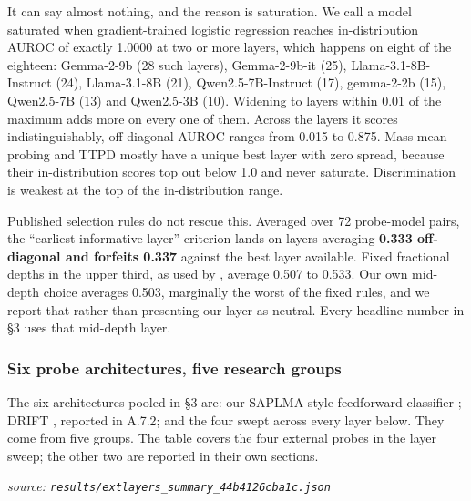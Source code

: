 \documentclass[10pt]{article}
\begin{document}
It can say almost nothing, and the reason is saturation. We call a model saturated when gradient-trained logistic regression reaches in-distribution AUROC of exactly 1.0000 at two or more layers, which happens on eight of the eighteen: Gemma-2-9b (28 such layers), Gemma-2-9b-it (25), Llama-3.1-8B-Instruct (24), Llama-3.1-8B (21), Qwen2.5-7B-Instruct (17), gemma-2-2b (15), Qwen2.5-7B (13) and Qwen2.5-3B (10). Widening to layers within 0.01 of the maximum adds more on every one of them. Across the layers it scores indistinguishably, off-diagonal AUROC ranges from 0.015 to 0.875. Mass-mean probing and TTPD mostly have a unique best layer with zero spread, because their in-distribution scores top out below 1.0 and never saturate. Discrimination is weakest at the top of the in-distribution range.

Published selection rules do not rescue this. Averaged over 72 probe-model pairs, the ``earliest informative layer'' criterion lands on layers averaging \textbf{0.333 off-diagonal and forfeits 0.337} against the best layer available. Fixed fractional depths in the upper third, as used by \citep{hussain2026parallax}, average 0.507 to 0.533. Our own mid-depth choice averages 0.503, marginally the worst of the fixed rules, and we report that rather than presenting our layer as neutral. Every headline number in §3 uses that mid-depth layer.

\subsubsection{Six probe architectures, five research groups}

The six architectures pooled in §3 are: our SAPLMA-style feedforward classifier \citep{azaria2023internal}; DRIFT \citep{hussain2026parallax}, reported in A.7.2; and the four swept across every layer below. They come from five groups. The table covers the four external probes in the layer sweep; the other two are reported in their own sections.

{\footnotesize\raggedright\sloppy \emph{source: \texttt{results/extlayers\_summary\_44b4126cba1c.json}}\par}

\begin{table}[H]
\centering
\small
{}
\end{table}
\end{document}
